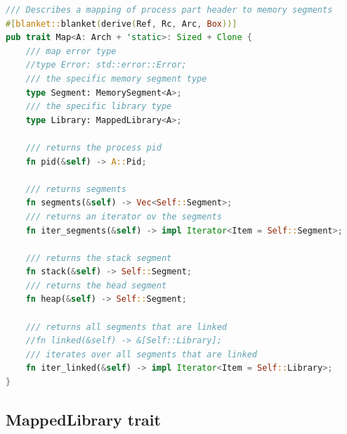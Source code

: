 \begin{lstlisting}[caption=\label{lst:map}{The Memory Map Trait definition}, language=Rust]
 /// Describes a mapping of process part header to memory segments
#[blanket::blanket(derive(Ref, Rc, Arc, Box))]
pub trait Map<A: Arch + 'static>: Sized + Clone {
    /// map error type
    //type Error: std::error::Error;
    /// the specific memory segment type
    type Segment: MemorySegment<A>;
    /// the specific library type
    type Library: MappedLibrary<A>;

    /// returns the process pid
    fn pid(&self) -> A::Pid;

    /// returns segments
    fn segments(&self) -> Vec<Self::Segment>;
    /// returns an iterator ov the segments
    fn iter_segments(&self) -> impl Iterator<Item = Self::Segment>;

    /// returns the stack segment
    fn stack(&self) -> Self::Segment;
    /// returns the head segment
    fn heap(&self) -> Self::Segment;

    /// returns all segments that are linked
    //fn linked(&self) -> &[Self::Library];
    /// iterates over all segments that are linked
    fn iter_linked(&self) -> impl Iterator<Item = Self::Library>;
}   
\end{lstlisting}

 \subsection{MappedLibrary trait}
 \label{reader:mapped_lib}

